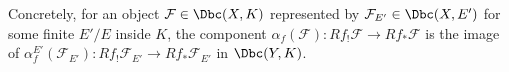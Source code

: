 \begin{definition}
Concretely, for an object $\mathcal{F} \in \Dbc(X, K)$ represented by $\mathcal{F}_{E'} \in \Dbc(X, E')$ for some finite $E'/E$ inside $K$, the component $\alpha_f(\mathcal{F}): Rf_! \mathcal{F} \to Rf_* \mathcal{F}$ is the image of $\alpha^{E'}_f(\mathcal{F}_{E'}): Rf_! \mathcal{F}_{E'} \to Rf_* \mathcal{F}_{E'}$ in $\Dbc(Y, K)$.
\end{definition}
